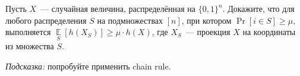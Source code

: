 Пусть $X$~--- случайная величина, распределённая на $\{0, 1\}^n$. Докажите, что для любого распределения
$S$ на подмножествах $[n]$, при котором $\Pr[i \in S] \ge \mu$, выполняется
$\mathop{\mathbb{E}}\limits_{S}[h(X_S)] \ge \mu \cdot h(X)$, где $X_S$~--- проекция $X$ на координаты из
множества $S$.

\textit{Подсказка:} попробуйте применить chain rule.